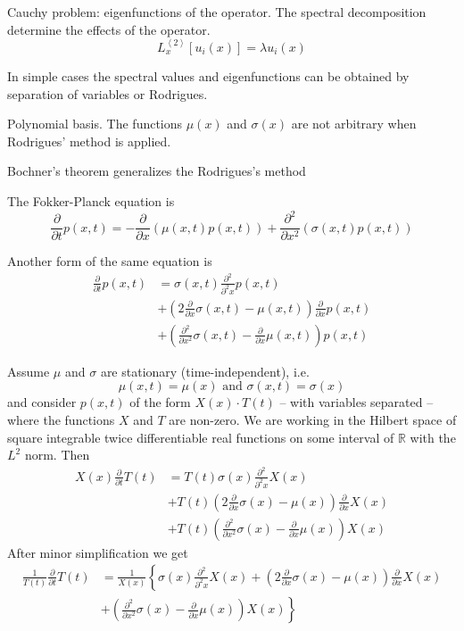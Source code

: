 \documentclass[a4paper]{article}
\newcommand{\clo}[1]{{\left [ #1 \right ]}}
\newcommand{\brac}[1]{{\left ( #1 \right )}}
\newcommand{\brkt}[1]{{\left\langle #1 \right\rangle}}
\newcommand{\Real}{\mathbb{R}}
\begin{document}
Cauchy problem: eigenfunctions of the operator. The spectral decomposition determine the effects of the operator.
\[L_x^\brkt{2}\clo{u_i(x)} = \lambda u_i(x)\]

In simple cases the spectral values and eigenfunctions can be obtained by separation of variables or Rodrigues.

Polynomial basis.
The functions $\mu(x)$ and $\sigma(x)$ are not arbitrary when Rodrigues' method is applied.

Bochner's theorem generalizes the Rodrigues's method


The Fokker-Planck equation is
\[\frac{\partial}{\partial t} p(x,t) = - \frac{\partial}{\partial x} \brac{ \mu(x,t) p(x,t) } + \frac{\partial^2}{\partial x^2} \brac{ \sigma(x,t) p(x,t) }\]

Another form of the same equation is
\begin{align*}
	\frac{\partial}{\partial t} p(x,t) &= \sigma(x,t) \frac{\partial^2}{\partial^2 x} p(x,t) \\
	&+ \brac{ 2 \frac{\partial}{\partial x} \sigma(x,t) - \mu(x,t) } \frac{\partial}{\partial x} p(x,t) \\
	&+ \brac{ \frac{\partial^2}{\partial x^2} \sigma(x,t) - \frac{\partial}{\partial x} \mu(x,t) } p(x,t) 
\end{align*}

Assume $\mu$ and $\sigma$ are stationary (time-independent), i.e. \[\mu(x,t) = \mu(x) \text{ and }\sigma(x,t) = \sigma(x)\]
and consider $p(x,t)$ of the form $X(x) \cdot T(t)$ -- with variables separated -- where the functions $X$ and $T$ are non-zero.
We are working in the Hilbert space of square integrable twice differentiable real functions on some interval of $\Real$ with the $L^2$ norm.
Then \begin{align*}
	X(x) \frac{\partial}{\partial t} T(t) &= T(t) \sigma(x) \frac{\partial^2}{\partial^2 x} X(x)\\
	&+ T(t) \brac{ 2 \frac{\partial}{\partial x} \sigma(x) - \mu(x) } \frac{\partial}{\partial x} X(x)\\
	&+ T(t) \brac{ \frac{\partial^2}{\partial x^2} \sigma(x) - \frac{\partial}{\partial x} \mu(x) } X(x)
\end{align*}
After minor simplification we get \begin{align*}
	\frac{1}{T(t)} \frac{\partial}{\partial t} T(t) &= \frac{1}{X(x)}\left \{ \sigma(x) \frac{\partial^2}{\partial^2 x} X(x) + \brac{ 2 \frac{\partial}{\partial x} \sigma(x) - \mu(x) } \frac{\partial}{\partial x} X(x) \right.\\
	&\left . + \brac{ \frac{\partial^2}{\partial x^2} \sigma(x) - \frac{\partial}{\partial x} \mu(x) } X(x) \right \}
\end{align*}
\end{document}
